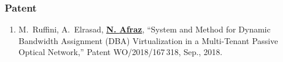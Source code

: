 \subsubsection{Patent}
    \begin{enumerate}
    \item M.~Ruffini, A.~Elrasad, \textbf{\underline{N. {Afraz}}}, ``System and {Method} for {Dynamic} {Bandwidth} {Assignment} (DBA) {Virtualization} in a {Multi}-{Tenant} {Passive} {Optical} {Network},'' Patent WO/2018/167\,318, Sep., 2018.
    \end{enumerate}


 





